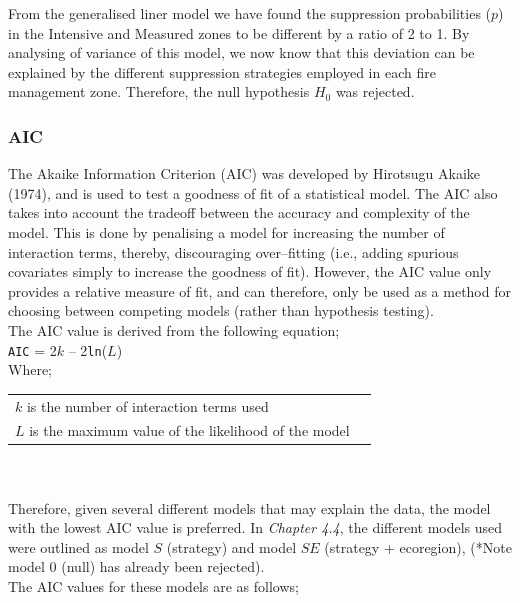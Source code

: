 \begin{spacing}{1.5}
\noindent From the generalised liner model we have found the suppression probabilities ($p$) in the Intensive and Measured zones to be different by a ratio of 2 to 1. By analysing of variance of this model, we now know that this deviation can be explained by the different suppression strategies employed in each fire management zone. Therefore, the null hypothesis $H_{\mathrm{0}}$ was rejected.

\subsubsection{AIC}

The Akaike Information Criterion (AIC) was developed by Hirotsugu Akaike (1974), and is used to test a goodness of fit of a statistical model. The AIC also takes into account the tradeoff between the accuracy and complexity of the model. This is done by penalising a model for increasing the number of interaction terms, thereby, discouraging over--fitting (i.e., adding spurious covariates simply to increase the goodness of fit). However, the AIC value only provides a relative measure of fit, and can therefore, only be used as a method for choosing between competing models (rather than hypothesis testing). \\

\noindent The AIC value is derived from the following equation; \\

\noindent \texttt{AIC} = 2$k$ -- 2\texttt{ln}($L$) \\

\noindent Where; \\

\begin{tabular}{ll}
$k$ is the number of interaction terms used \\
$L$ is the maximum value of the likelihood of the model \\
\end{tabular}\\ \\

\noindent Therefore, given several different models that may explain the data, the model with the lowest AIC value is preferred. In \emph{Chapter 4.4}, the different models used were outlined as model $S$ (strategy) and model $SE$ (strategy + ecoregion), (*Note model $0$ (null) has already been rejected). \\

\noindent The AIC values for these models are as follows; \\


\end{spacing}
